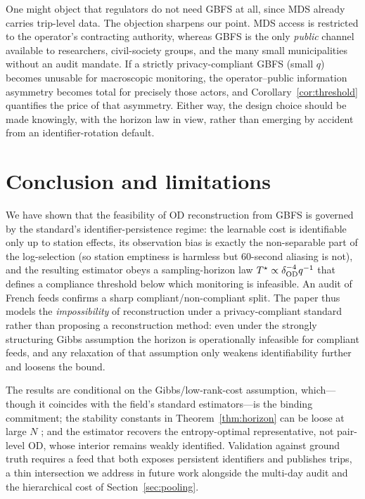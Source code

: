 One might object that regulators do not need GBFS at all, since MDS already
carries trip-level data. The objection sharpens our point. MDS access is
restricted to the operator's contracting authority, whereas GBFS is the only
\emph{public} channel available to researchers, civil-society groups, and the
many small municipalities without an audit mandate. If a strictly
privacy-compliant GBFS (small $q$) becomes unusable for macroscopic monitoring,
the operator--public information asymmetry becomes total for precisely those
actors, and Corollary~\ref{cor:threshold} quantifies the price of that
asymmetry. Either way, the design choice should be made knowingly, with the
horizon law in view, rather than emerging by accident from an
identifier-rotation default.

\section{Conclusion and limitations}
\label{sec:conclusion}

We have shown that the feasibility of OD reconstruction from GBFS is governed by
the standard's identifier-persistence regime: the learnable cost is identifiable
only up to station effects, its observation bias is exactly the non-separable
part of the log-selection (so station emptiness is harmless but 60-second
aliasing is not), and the resulting estimator obeys a sampling-horizon law
$T^{\star}\propto\delta_{\mathrm{OD}}^{-4}q^{-1}$ that defines a compliance threshold below
which monitoring is infeasible. An audit of French feeds confirms a sharp
compliant/non-compliant split. The paper thus models the \emph{impossibility} of
reconstruction under a privacy-compliant standard rather than proposing a
reconstruction method: even under the strongly structuring Gibbs assumption the
horizon is operationally infeasible for compliant feeds, and any relaxation of
that assumption only weakens identifiability further and loosens the bound.

The results are conditional on the Gibbs/low-rank-cost assumption, which---though
it coincides with the field's standard estimators---is the binding commitment;
the stability constants in Theorem~\ref{thm:horizon} can be loose at large $N$
\citep{MenaNilesWeed2019,Genevay2019}; and the estimator recovers the
entropy-optimal representative, not pair-level OD, whose interior remains weakly
identified. Validation against ground truth requires a feed that both exposes
persistent identifiers and publishes trips, a thin intersection we address in
future work alongside the multi-day audit and the hierarchical cost of
Section~\ref{sec:pooling}.

